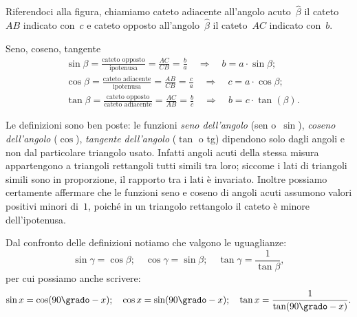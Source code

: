 Riferendoci alla figura, chiamiamo cateto adiacente all'angolo 
acuto~$\hat{\beta}$ il cateto~${AB}$ indicato con~$c$ e cateto opposto 
all'angolo~$\hat{\beta}$ il
cateto~${AC}$ indicato con~$b$.

\begin{definizione}
Seno, coseno, tangente
\begin{align*}
&\sin \beta=\frac{\text{cateto opposto}}{\text{ipotenusa}}=
\frac{AC}{CB}=\frac{b}{a} \quad \Rightarrow \quad b=a\cdot \sin \beta ;\\
&\cos \beta=\frac{\text{cateto adiacente}}{\text{ipotenusa}}=
\frac{AB}{CB}=\frac{c}{a} \quad \Rightarrow \quad c=a\cdot \cos \beta ;\\
&\tan \beta=\frac{\text{cateto opposto}}{\text{cateto adiacente}}=
\frac{AC}{AB}=\frac{b}{c} \quad \Rightarrow \quad b=c\cdot \tan(\beta ).
\end{align*}
\end{definizione}



Le definizioni sono ben poste: le funzioni \emph{seno dell'angolo} (sen 
o~$\sin$), \emph{coseno dell'angolo} ($\cos$), \emph{tangente dell'angolo}
($\tan$ o tg) dipendono solo dagli angoli e non dal particolare triangolo usato. 
Infatti angoli acuti della stessa misura appartengono a
triangoli rettangoli tutti simili tra loro; siccome i lati di triangoli simili 
sono in proporzione, il rapporto tra i lati è invariato.
Inoltre possiamo certamente affermare che le funzioni seno e coseno di angoli 
acuti assumono valori positivi minori di~$1$,
poiché in un triangolo rettangolo il cateto è minore dell'ipotenusa.

Dal confronto delle definizioni notiamo che valgono le uguaglianze:
 \[\sin \gamma=\cos \beta;\quad \cos \gamma=\sin \beta;\quad \tan 
\gamma=\frac{1}{\tan \beta},\]
 per cui possiamo anche scrivere:
\[\sin x=\cos (90\grado-x);\quad \cos x=\sin (90\grado-x);\quad 
\tan x=\frac{1}{\tan(90\grado-x)}.\]

